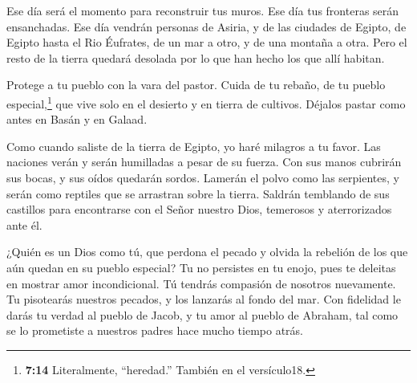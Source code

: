  Ese día será el momento para reconstruir tus muros. Ese
día tus fronteras serán ensanchadas.  Ese día vendrán
personas de Asiria, y de las ciudades de Egipto, de Egipto hasta el Rio
Éufrates, de un mar a otro, y de una montaña a otra.  Pero
el resto de la tierra quedará desolada por lo que han hecho los que allí
habitan.

 Protege a tu pueblo con la vara del pastor. Cuida de tu
rebaño, de tu pueblo especial,\footnote{\textbf{7:14} Literalmente,
  ``heredad.'' También en el versículo18.} que vive solo en el desierto
y en tierra de cultivos. Déjalos pastar como antes en Basán y en Galaad.

 Como cuando saliste de la tierra de Egipto, yo haré
milagros a tu favor.  Las naciones verán y serán humilladas
a pesar de su fuerza. Con sus manos cubrirán sus bocas, y sus oídos
quedarán sordos.  Lamerán el polvo como las serpientes, y
serán como reptiles que se arrastran sobre la tierra. Saldrán temblando
de sus castillos para encontrarse con el Señor nuestro Dios, temerosos y
aterrorizados ante él.

 ¿Quién es un Dios como tú, que perdona el pecado y olvida
la rebelión de los que aún quedan en su pueblo especial? Tu no persistes
en tu enojo, pues te deleitas en mostrar amor incondicional.
 Tú tendrás compasión de nosotros nuevamente. Tu pisotearás
nuestros pecados, y los lanzarás al fondo del mar.  Con
fidelidad le darás tu verdad al pueblo de Jacob, y tu amor al pueblo de
Abraham, tal como se lo prometiste a nuestros padres hace mucho tiempo
atrás.
